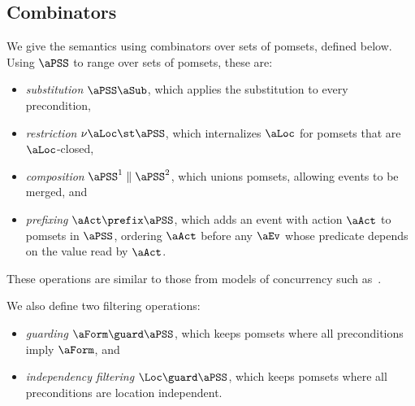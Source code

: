 \subsection{Combinators}
\label{sec:combinators}
We give the semantics using combinators over sets of pomsets, defined below.
Using $\aPSS$ to range over sets of pomsets, these are:
\begin{itemize}
\item \emph{substitution} $\aPSS\aSub$, which applies the substitution to
  every precondition,
\item \emph{restriction} $\nu\aLoc\st\aPSS$, which internalizes $\aLoc$ for
  pomsets that are $\aLoc$-closed,
\item \emph{composition} $\aPSS^1\parallel\aPSS^2$, which unions pomsets, allowing events to be merged, and
\item \emph{prefixing} $\aAct\prefix\aPSS$, which adds an event with action
  $\aAct$ to pomsets in $\aPSS$, ordering $\aAct$ before any $\aEv$ whose predicate
  depends on the value read by $\aAct$.
\end{itemize}
These operations are similar to those from models of concurrency such
as~\cite{Brookes:1984:TCS:828.833}.

We also define two filtering operations:
\begin{itemize}
\item \emph{guarding} $\aForm\guard\aPSS$, which
  keeps pomsets where all preconditions imply $\aForm$, and
\item \emph{independency filtering} $\Loc\guard\aPSS$, which keeps pomsets
  where all preconditions are location independent.
\end{itemize}


